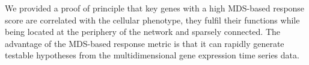 We provided a proof of principle that key genes with a high MDS-based response
score are correlated with the cellular phenotype, they fulfil their functions
while being located at the periphery of the network and sparsely connected.
The advantage of the MDS-based response metric is that it can rapidly generate
testable hypotheses from the multidimensional gene expression time series data.

